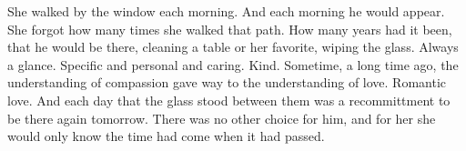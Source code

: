 

She walked by the window each morning.  And each morning he would
appear.  She forgot how many times she walked that path.  How many
years had it been, that he would be there, cleaning a table or her
favorite, wiping the glass.  Always a glance.  Specific and personal
and caring.  Kind.  Sometime, a long time ago, the understanding of
compassion gave way to the understanding of love.  Romantic love.  And
each day that the glass stood between them was a recommittment to be
there again tomorrow.  There was no other choice for him, and for her
she would only know the time had come when it had passed.

\bye
